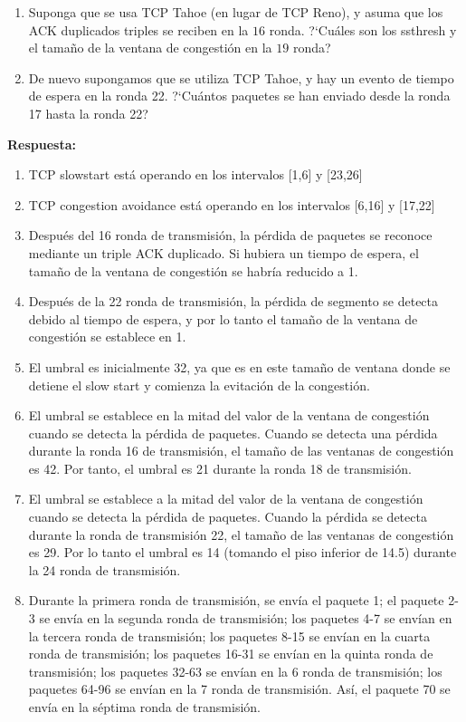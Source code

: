 \documentclass[a4paper, 11pt]{article}
\theoremstyle{definition} \theoremstyle{remark}
\begin{document}
{\begin{enumerate}
              \item Suponga que se usa TCP Tahoe (en lugar de TCP Reno), y asuma que los ACK duplicados triples se reciben en la $16$ ronda. ?`Cu\'ales son los ssthresh y el tama\~{n}o de la ventana de congesti\'on en la $19$ ronda?
              \item De nuevo supongamos que se utiliza TCP Tahoe, y hay un evento de tiempo de espera en la ronda 22. ?`Cu\'antos paquetes se han enviado desde la ronda 17 hasta la ronda 22?
            \end{enumerate}}

    \textbf{Respuesta:}
    \begin{enumerate}
      \item TCP slowstart est\'a operando en los intervalos [1,6] y [23,26]
      \item TCP congestion avoidance est\'a operando en los intervalos [6,16] y [17,22]
      \item Despu\'es del 16 ronda de transmisi\'on, la p\'erdida de paquetes se reconoce mediante un triple ACK duplicado. Si hubiera un tiempo de espera, el tama\~{n}o de la ventana de congesti\'on se habr\'ia reducido a 1.
      \item Despu\'es de la 22 ronda de transmisi\'on, la p\'erdida de segmento se detecta debido al tiempo de espera, y por lo tanto el tama\~{n}o de la ventana de congesti\'on se establece en 1.
      \item El umbral es inicialmente 32, ya que es en este tama\~{n}o de ventana donde se detiene el slow start y comienza la evitaci\'on de la congesti\'on.
      \item El umbral se establece en la mitad del valor de la ventana de congesti\'on cuando se detecta la p\'erdida de paquetes. Cuando se detecta una p\'erdida durante la ronda 16 de transmisi\'on, el tama\~{n}o de las ventanas de congesti\'on es 42. Por tanto, el umbral es 21 durante la ronda 18 de transmisi\'on.
      \item El umbral se establece a la mitad del valor de la ventana de congesti\'on cuando se detecta la p\'erdida de paquetes. Cuando la p\'erdida se detecta durante la ronda de transmisi\'on 22, el tama\~{n}o de las ventanas de congesti\'on es 29. Por lo tanto el umbral es 14 (tomando el piso inferior de 14.5) durante la 24 ronda de transmisi\'on.
      \item Durante la primera ronda de transmisi\'on, se env\'ia el paquete 1; el paquete 2-3 se env\'ia en la segunda ronda de transmisi\'on; los paquetes 4-7 se env\'ian en la tercera ronda de transmisi\'on; los paquetes 8-15 se env\'ian en la cuarta ronda de transmisi\'on; los paquetes 16-31 se env\'ian en la quinta ronda de transmisi\'on; los paquetes 32-63 se env\'ian en la 6 ronda de transmisi\'on; los paquetes 64-96 se env\'ian en la 7 ronda de transmisi\'on. As\'i, el paquete 70 se env\'ia en la s\'eptima ronda de transmisi\'on.

\end{enumerate}
\end{document}

